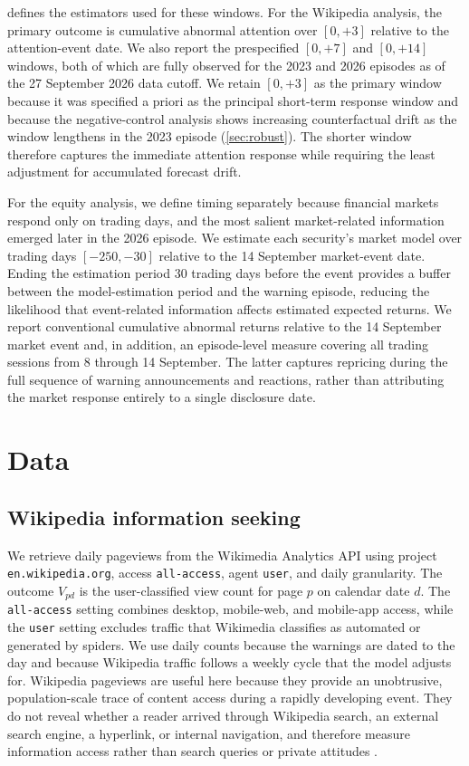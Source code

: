 \elsevierclasstrue\documentclass[preprint,12pt]{elsarticle}%
\begin{document}
 defines the estimators used for these windows. For the Wikipedia analysis, the primary outcome is cumulative abnormal attention over $[0,+3]$ relative to the attention-event date. We also report the prespecified $[0,+7]$ and $[0,+14]$ windows, both of which are fully observed for the 2023 and 2026 episodes as of the 27 September 2026 data cutoff. We retain $[0,+3]$ as the primary window because it was specified a priori as the principal short-term response window and because the negative-control analysis shows increasing counterfactual drift as the window lengthens in the 2023 episode (\cref{sec:robust}). The shorter window therefore captures the immediate attention response while requiring the least adjustment for accumulated forecast drift.

For the equity analysis, we define timing separately because financial markets respond only on trading days, and the most salient market-related information emerged later in the 2026 episode. We estimate each security's market model over trading days $[-250,-30]$ relative to the 14 September market-event date. Ending the estimation period 30 trading days before the event provides a buffer between the model-estimation period and the warning episode, reducing the likelihood that event-related information affects estimated expected returns. We report conventional cumulative abnormal returns relative to the 14 September market event and, in addition, an episode-level measure covering all trading sessions from 8 through 14 September. The latter captures repricing during the full sequence of warning announcements and reactions, rather than attributing the market response entirely to a single disclosure date.


\section{Data}
\subsection{Wikipedia information seeking}

We retrieve daily pageviews from the Wikimedia Analytics API \citep{wikimedia2026api} using project \texttt{en.wikipedia.org}, access \texttt{all-access}, agent \texttt{user}, and daily granularity. The outcome \(V_{pd}\) is the user-classified view count for page \(p\) on calendar date \(d\). The \texttt{all-access} setting combines desktop, mobile-web, and mobile-app access, while the \texttt{user} setting excludes traffic that Wikimedia classifies as automated or generated by spiders. We use daily counts because the warnings are dated to the day and because Wikipedia traffic follows a weekly cycle that the model adjusts for. Wikipedia pageviews are useful here because they provide an unobtrusive, population-scale trace of content access during a rapidly developing event. They do not reveal whether a reader arrived through Wikipedia search, an external search engine, a hyperlink, or internal navigation, and therefore measure information access rather than search queries or private attitudes \citep{dimitrov2018query,ribeiro2021wikipedia}.
\end{document}
